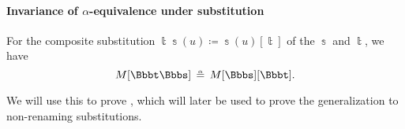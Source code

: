 \paragraph{Invariance of \( \alpha \)-equivalence under substitution}

\begin{lemma}\label{thm:renaming_composition_is_alpha_equivalent}
  For the composite substitution \( \Bbbt\Bbbs(u) \coloneqq \Bbbs(u)[\Bbbt] \) of the \hyperref[def:lambda_renaming]{} \( \Bbbs \) and \( \Bbbt \), we have
  \begin{equation}\label{eq:thm:renaming_composition_is_alpha_equivalent}
    M[\Bbbt\Bbbs] \aequiv M[\Bbbs][\Bbbt].
  \end{equation}
\end{lemma}
\begin{comments}
  \item We will use this to prove , which will later be used to prove the generalization  to non-renaming substitutions.
\end{comments}
